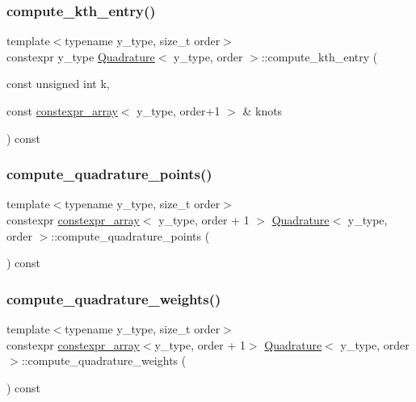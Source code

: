 \subsubsection{\texorpdfstring{compute\+\_\+kth\+\_\+entry()}{compute\_kth\_entry()}}
{\footnotesize\ttfamily template$<$typename y\+\_\+type, size\+\_\+t order$>$ \\
constexpr y\+\_\+type \hyperlink{class_quadrature}{Quadrature}$<$ y\+\_\+type, order $>$\+::compute\+\_\+kth\+\_\+entry (\begin{DoxyParamCaption}\item[{const unsigned int}]{k,  }\item[{const \hyperlink{classconstexpr__array}{constexpr\+\_\+array}$<$ y\+\_\+type, order+1 $>$ \&}]{knots }\end{DoxyParamCaption}) const\hspace{0.3cm}{\ttfamily [inline]}}

\mbox{\label{class_quadrature_a9c99c8f4086eec3e94e0eae8a50506ff}} 
\subsubsection{\texorpdfstring{compute\+\_\+quadrature\+\_\+points()}{compute\_quadrature\_points()}}
{\footnotesize\ttfamily template$<$typename y\+\_\+type, size\+\_\+t order$>$ \\
constexpr \hyperlink{classconstexpr__array}{constexpr\+\_\+array}$<$ y\+\_\+type, order + 1 $>$ \hyperlink{class_quadrature}{Quadrature}$<$ y\+\_\+type, order $>$\+::compute\+\_\+quadrature\+\_\+points (\begin{DoxyParamCaption}{ }\end{DoxyParamCaption}) const\hspace{0.3cm}{\ttfamily [inline]}}

\mbox{\label{class_quadrature_a904e3b1cad3b304b500701354b30e194}} 
\subsubsection{\texorpdfstring{compute\+\_\+quadrature\+\_\+weights()}{compute\_quadrature\_weights()}}
{\footnotesize\ttfamily template$<$typename y\+\_\+type, size\+\_\+t order$>$ \\
constexpr \hyperlink{classconstexpr__array}{constexpr\+\_\+array}$<$y\+\_\+type, order + 1$>$ \hyperlink{class_quadrature}{Quadrature}$<$ y\+\_\+type, order $>$\+::compute\+\_\+quadrature\+\_\+weights (\begin{DoxyParamCaption}{ }\end{DoxyParamCaption}) const\hspace{0.3cm}{\ttfamily [inline]}}

